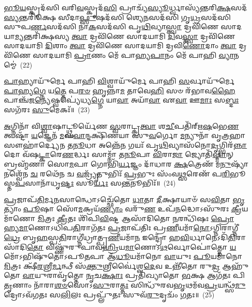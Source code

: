 {\anuvakamend[{\-\ul{𑌵𑌿}\-\-\ul{𑌦𑍍𑌯𑍁}\-𑌥𑍍𑌸𑌨𑌿᳴\-\ul{𑌰𑍍𑌦𑍍𑌯𑍁}\-𑌤𑍍𑌵𑍈\-\ul{𑌕𑌾}\-𑌨𑍍𑌨\-\ul{𑌤𑍍𑌰𑌿}\-\-\ul{𑍞}\-𑌶𑌚𑍍𑌚᳴}]}%

\-\ul{𑌭𑍂}\-\-\ul{𑌯}\-𑌸𑍍𑌕𑍃𑌦᳴𑌸𑌿 𑌵𑌰𑌿\-\ul{𑌵}\-𑌸𑍍𑌕𑍃𑌦᳴\-\ul{𑌸𑌿} 𑌪𑍍𑌰𑌾𑌚𑍍𑌯᳴\-\ul{𑌸𑍍𑌯𑍂}\-𑌰𑍍𑌧𑍍𑌵𑌾𑌸𑍍𑌯᳴𑌨𑍍𑌤𑌰𑌿\-\ul{𑌕𑍍𑌷}\-𑌸𑌦᳴\-\ul{𑌸𑍍𑌯}\-𑌨𑍍𑌤𑌰𑌿᳴𑌕𑍍𑌷𑍇 𑌸𑍀𑌦𑌾\-\ul{𑌫𑍍𑌸𑍁}\-𑌷𑌦᳴𑌸𑌿 𑌶𑍍𑌯𑍇\-\ul{𑌨}\-𑌸𑌦᳴𑌸𑌿 𑌗𑍃\-\ul{𑌧𑍍𑌰}\-𑌸𑌦᳴𑌸𑌿 𑌸𑍁𑌪\-\ul{𑌰𑍍𑌣}\-𑌸𑌦᳴𑌸𑌿 𑌨𑌾\-\ul{𑌕}\-𑌸𑌦᳴𑌸𑌿 𑌪𑍃\-\ul{𑌥𑌿}\-𑌵𑍍𑌯𑌾\-\ul{𑌸𑍍𑌤𑍍𑌵𑌾} 𑌦𑍍𑌰𑌵𑌿᳴𑌣𑍇 𑌸𑌾𑌦𑌯𑌾\-\ul{𑌮𑍍𑌯}\-𑌨𑍍𑌤𑌰𑌿᳴𑌕𑍍𑌷𑌸𑍍𑌯 \ul{𑌤𑍍𑌵𑌾} 𑌦𑍍𑌰𑌵𑌿᳴𑌣𑍇 𑌸𑌾𑌦𑌯𑌾𑌮𑌿 \ul{𑌦𑌿}\-𑌵\-\ul{𑌸𑍍𑌤𑍍𑌵𑌾} 𑌦𑍍𑌰𑌵𑌿᳴𑌣𑍇 𑌸𑌾𑌦𑌯𑌾𑌮𑌿 \ul{𑌦𑌿}\-𑌶𑌾𑌂 \ul{𑌤𑍍𑌵𑌾} 𑌦𑍍𑌰𑌵𑌿᳴𑌣𑍇 𑌸𑌾𑌦𑌯𑌾𑌮𑌿 𑌦𑍍𑌰𑌵𑌿\-\ul{𑌣𑍋}\-𑌦𑌾𑌂 \ul{𑌤𑍍𑌵𑌾} 𑌦𑍍𑌰𑌵𑌿᳴𑌣𑍇 𑌸𑌾𑌦𑌯𑌾𑌮𑌿 \ul{𑌪𑍍𑌰𑌾}\-𑌣𑌂 𑌮𑍇᳴ 𑌪𑌾𑌹𑍍𑌯\-\ul{𑌪𑌾}\-𑌨𑌂 𑌮𑍇᳴ 𑌪𑌾𑌹𑌿 \ul{𑌵𑍍𑌯𑌾}\-𑌨𑌮𑍍𑌮𑍇॑~(22)

\-\ul{𑌪𑌾}\-𑌹𑍍𑌯𑌾𑌯𑍁᳴𑌰𑍍𑌮𑍇 𑌪𑌾𑌹𑌿 \ul{𑌵𑌿}\-𑌶𑍍𑌵𑌾𑌯𑍁᳴𑌰𑍍𑌮𑍇 𑌪𑌾𑌹𑌿 \ul{𑌸}\-𑌰𑍍𑌵𑌾𑌯𑍁᳴𑌰𑍍𑌮𑍇 \ul{𑌪𑌾}\-𑌹𑍍𑌯\-\ul{𑌗𑍍𑌨𑍇} 𑌯\-\ul{𑌤𑍍𑌤𑍇} 𑌪\-\ul{𑌰}\-\-\ul{𑍞} 𑌹𑍃𑌨𑍍𑌨𑌾\-\ul{𑌮} 𑌤𑌾𑌵𑍇\-\ul{𑌹𑌿} 𑌸𑍞 𑌰᳴𑌭𑌾𑌵\-\ul{𑌹𑍈} 𑌪𑌾𑌞𑍍𑌚᳴𑌜\-\ul{𑌨𑍍𑌯𑍇}\-𑌷𑍍𑌵𑌪𑍍𑌯𑍇॑𑌧𑍍𑌯\-\ul{𑌗𑍍𑌨𑍇} 𑌯𑌾\-\ul{𑌵𑌾} 𑌅𑌯𑌾᳴\-\ul{𑌵𑌾} 𑌏\-\ul{𑌵𑌾} 𑌊\-\ul{𑌮𑌾𑌃} 𑌸\-\ul{𑌬𑍍𑌦𑌃} 𑌸𑌗᳴𑌰𑌃 \ul{𑌸𑍁}\-𑌮𑍇𑌕𑌃᳴॥~(23)

{\anuvakamend[{\-\ul{𑌵𑍍𑌯𑌾}\-𑌨\-\ul{𑌮𑍍𑌮𑍇} 𑌦𑍍𑌵𑌾𑌤𑍍𑌰𑌿𑍞᳴𑌶𑌚𑍍𑌚}]}%

\-\ul{𑌅}\-𑌗𑍍𑌨𑌿𑌨𑌾᳴ 𑌵𑌿\-\ul{𑌶𑍍𑌵𑌾}\-𑌷𑌾𑌟𑍍𑌥𑍍𑌸𑍂𑌰𑍍𑌯𑍇᳴𑌣 \ul{𑌸𑍍𑌵}\-𑌰𑌾𑌟𑍍𑌕𑍍𑌰\-\ul{𑌤𑍍𑌵𑌾} 𑌶\-\ul{𑌚𑍀}\-𑌪𑌤𑌿᳴𑌰𑍍\mbox{}𑌋\-\ul{𑌷}\-𑌭𑍇\-\ul{𑌣} 𑌤𑍍𑌵𑌷𑍍𑌟𑌾᳴ \ul{𑌯}\-𑌜𑍍𑌞𑍇𑌨᳴ \ul{𑌮}\-𑌘\-\ul{𑌵𑌾}\-𑌨𑍍𑌦𑌕𑍍𑌷𑌿᳴𑌣𑌯𑌾 𑌸𑍁\-\ul{𑌵}\-𑌰𑍍𑌗𑍋 \ul{𑌮}\-𑌨𑍍𑌯𑍁𑌨𑌾᳴ 𑌵𑍃\-\ul{𑌤𑍍𑌰}\-𑌹𑌾 𑌸𑍗𑌹𑌾॑𑌰𑍍𑌦𑍍𑌯𑍇𑌨 𑌤\-\ul{𑌨𑍂}\-𑌧𑌾 𑌅𑌨𑍍𑌨𑍇᳴\-\ul{𑌨} 𑌗𑌯𑌃᳴ 𑌪𑍃\-\ul{𑌥𑌿}\-𑌵𑍍𑌯𑌾𑌸᳴𑌨𑍋\-\ul{𑌦𑍃}\-𑌗𑍍𑌭𑌿𑌰᳴\-\ul{𑌨𑍍𑌨𑌾}\-𑌦𑍋 𑌵᳴𑌷\-\ul{𑌟𑍍𑌕𑌾}\-𑌰𑍇\-\ul{𑌣}\-𑌰𑍍𑌦𑍍𑌧𑌃 𑌸𑌾𑌮𑍍𑌨𑌾᳴ 𑌤\-\ul{𑌨𑍂}\-𑌪𑌾 \ul{𑌵𑌿}\-𑌰𑌾\-\ul{𑌜𑌾} 𑌜𑍍𑌯𑍋𑌤𑌿᳴\-\ul{𑌷𑍍𑌮𑌾}\-𑌨𑍍 𑌬𑍍𑌰𑌹𑍍𑌮᳴𑌣𑌾 𑌸𑍋\-\ul{𑌮}\-𑌪𑌾 𑌗𑍋𑌭𑌿᳴\-\ul{𑌰𑍍𑌯}\-𑌜𑍍𑌞𑌂 𑌦𑌾᳴𑌧𑌾𑌰 \ul{𑌕𑍍𑌷}\-𑌤𑍍𑌰𑍇𑌣᳴ 𑌮\-\ul{𑌨𑍁}\-𑌷𑍍𑌯𑌾᳴𑌨𑌶𑍍𑌵𑍇᳴𑌨 \ul{𑌚} 𑌰𑌥𑍇᳴𑌨 𑌚 \ul{𑌵}\-𑌜𑍍𑌰𑍍𑌯𑍃᳴𑌤𑍁𑌭𑌿𑌃᳴ \ul{𑌪𑍍𑌰}\-𑌭𑍁𑌃 𑌸𑌂᳴𑌵\-\ul{𑌥𑍍𑌸}\-𑌰𑍇𑌣᳴ 𑌪\-\ul{𑌰𑌿}\-𑌭𑍂𑌸𑍍𑌤\-\ul{𑌪}\-𑌸𑌾𑌨𑌾᳴𑌧𑍃\-\ul{𑌷𑍍𑌟𑌃} 𑌸𑍂\-\ul{𑌰𑍍𑌯𑌃} 𑌸\-\ul{𑌨𑍍𑌤}\-𑌨𑍂𑌭𑌿𑌃᳴॥~(24)

{\anuvakamend[{\-\ul{𑌅}\-𑌗𑍍𑌨𑌿𑌨𑍈\-\ul{𑌕𑌾}\-𑌨𑍍𑌨𑌪᳴\-\ul{𑌞𑍍𑌚𑌾}\-𑌶𑌤𑍍}]}%

\-\ul{𑌪𑍍𑌰}\-𑌜𑌾𑌪᳴\-\ul{𑌤𑌿}\-𑌰𑍍𑌮\-\ul{𑌨}\-𑌸𑌾𑌨𑍍𑌧𑍋\-𑌽𑌚𑍍𑌛𑍇᳴𑌤𑍋 \ul{𑌧𑌾}\-𑌤𑌾 \ul{𑌦𑍀}\-𑌕𑍍𑌷𑌾𑌯𑌾𑍞᳴ 𑌸\-\ul{𑌵𑌿}\-𑌤𑌾 \ul{𑌭𑍃}\-𑌤𑍍𑌯𑌾𑌂 \ul{𑌪𑍂}\-𑌷𑌾 𑌸𑍋᳴\-\ul{𑌮}\-𑌕𑍍𑌰𑌯᳴\-\ul{𑌣𑍍𑌯𑌾𑌂} 𑌵𑌰𑍁᳴\-\ul{𑌣} 𑌉𑌪᳴\-\ul{𑌨}\-𑌦𑍍𑌧𑍋\-𑌽𑌸𑍁᳴𑌰𑌃 \ul{𑌕𑍍𑌰𑍀}\-𑌯𑌮𑌾᳴𑌣𑍋 \ul{𑌮𑌿}\-𑌤𑍍𑌰𑌃 \ul{𑌕𑍍𑌰𑍀}\-𑌤𑌃 𑌶𑌿᳴𑌪𑌿\-\ul{𑌵𑌿}\-𑌷𑍍𑌟 𑌆𑌸𑌾᳴𑌦𑌿𑌤𑍋 \ul{𑌨}\-𑌰𑌨𑍍𑌧𑌿᳴𑌷𑌃 \ul{𑌪𑍍𑌰𑍋}\-𑌹𑍍𑌯\-\ul{𑌮𑌾}\-𑌣𑍋\-𑌽𑌧𑌿᳴𑌪\-\ul{𑌤𑌿}\-𑌰𑌾𑌗᳴𑌤𑌃 \ul{𑌪𑍍𑌰}\-𑌜𑌾𑌪᳴𑌤𑌿𑌃 𑌪𑍍𑌰\-\ul{𑌣𑍀}\-𑌯𑌮𑌾᳴\-\ul{𑌨𑍋}\-\-𑌽𑌗𑍍𑌨𑌿𑌰𑌾𑌗𑍍𑌨𑍀॑\-\ul{𑌧𑍍𑌰𑍇} 𑌬𑍃\-\ul{𑌹}\-𑌸𑍍𑌪\-\ul{𑌤𑌿}\-𑌰𑌾𑌗𑍍𑌨𑍀॑𑌧𑍍𑌰𑌾𑌤𑍍𑌪𑍍𑌰\-\ul{𑌣𑍀}\-𑌯𑌮𑌾᳴\-\ul{𑌨} 𑌇𑌨𑍍𑌦𑍍𑌰𑍋᳴ 𑌹\-\ul{𑌵𑌿}\-𑌰𑍍𑌧𑌾𑌨𑍇\-𑌽𑌦𑌿᳴\-\ul{𑌤𑌿}\-𑌰𑌾𑌸𑌾᳴𑌦𑌿\-\ul{𑌤𑍋} 𑌵𑌿𑌷𑍍𑌣𑍁᳴𑌰𑍁𑌪𑌾𑌵\-\ul{𑌹𑍍𑌰𑌿}\-𑌯\-\ul{𑌮𑌾}\-𑌣𑍋\-𑌽\-\ul{𑌥}\-𑌰𑍍𑌵𑍋𑌪𑍋॑𑌤𑍍𑌤𑍋 \ul{𑌯}\-𑌮𑍋᳴\-𑌽𑌭𑌿𑌷𑍁᳴𑌤𑍋\-𑌽𑌪𑍂\-\ul{𑌤}\-𑌪𑌾 𑌆᳴\-\ul{𑌧𑍂}\-𑌯𑌮𑌾᳴𑌨𑍋 \ul{𑌵𑌾}\-𑌯𑍁𑌃 \ul{𑌪𑍂}\-𑌯𑌮𑌾᳴𑌨𑍋 \ul{𑌮𑌿}\-𑌤𑍍𑌰𑌃 𑌕𑍍𑌷𑍀᳴\-\ul{𑌰}\-𑌶𑍍𑌰𑍀\-\ul{𑌰𑍍𑌮}\-𑌨𑍍𑌥𑍀 𑌸᳴\-\ul{𑌕𑍍𑌤𑍁}\-𑌶𑍍𑌰𑍀𑌰𑍍𑌵𑍈॑𑌶𑍍𑌵\-\ul{𑌦𑍇}\-𑌵 𑌉𑌨𑍍𑌨𑍀᳴𑌤𑍋 𑌰𑍁\-\ul{𑌦𑍍𑌰} 𑌆𑌹𑍁᳴𑌤𑍋 \ul{𑌵𑌾}\-𑌯𑍁𑌰𑌾𑌵𑍃᳴𑌤𑍍𑌤𑍋 \ul{𑌨𑍃}\-𑌚\-\ul{𑌕𑍍𑌷𑌾𑌃} 𑌪𑍍𑌰𑌤𑌿᳴𑌖𑍍𑌯𑌾𑌤𑍋 \ul{𑌭}\-𑌕𑍍𑌷 𑌆𑌗᳴𑌤𑌃 𑌪𑌿\-\ul{𑌤𑍃}\-𑌣𑌾𑌂 𑌨𑌾᳴𑌰𑌾\-\ul{𑌶}\-\-\ul{𑍞}\-𑌸𑍋\-𑌽\-\ul{𑌸𑍁}\-𑌰𑌾\-\ul{𑌤𑍍𑌤𑌃} 𑌸𑌿𑌨𑍍𑌧𑍁᳴𑌰𑌵\-\ul{𑌭𑍃}\-𑌥𑌮᳴𑌵\-\ul{𑌪𑍍𑌰}\-𑌯𑌨𑍍𑌥𑍍𑌸᳴\-\ul{𑌮𑍁}\-𑌦𑍍𑌰𑍋\-𑌽𑌵᳴𑌗𑌤𑌃 𑌸\-\ul{𑌲𑌿}\-𑌲𑌃 𑌪𑍍𑌰𑌪𑍍𑌲𑍁᳴𑌤𑌃 𑌸𑍁𑌵᳴\-\ul{𑌰𑍁}\-𑌦𑍃𑌚𑌂᳴ \ul{𑌗}\-𑌤𑌃॥~(25)


